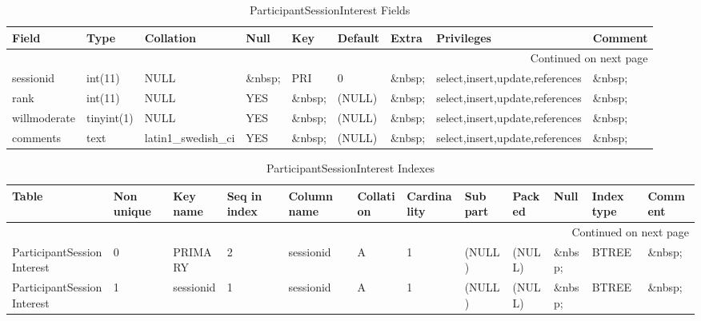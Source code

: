 \documentclass[tablesignature]{scrartcl}
\begin{document}
\begin{longtable}{|l|l|l|l|l|l|l|l|l|}
\caption{ParticipantSessionInterest Fields} \label{tbl:participantsessioninterestfields}\\
\hline
 Field         &  Type         &  Collation                &  Null     &  Key      &  Default  &  Extra    &  Privileges                       &  Comment \\
\hline
\endhead
\hline\multicolumn{9}{r}{Continued on next page}\
\endfoot
\endlastfoot
\hline
 badgeid       &  varchar(15)  &  latin1\_{}swedish\_{}ci  &  \&nbsp;  &  PRI      &  \&nbsp;  &  \&nbsp;  &  select,insert,update,references  &  \&nbsp;  \\
 sessionid     &  int(11)      &  NULL                     &  \&nbsp;  &  PRI      &  0        &  \&nbsp;  &  select,insert,update,references  &  \&nbsp;  \\
 rank          &  int(11)      &  NULL                     &  YES      &  \&nbsp;  &  (NULL)   &  \&nbsp;  &  select,insert,update,references  &  \&nbsp;  \\
 willmoderate  &  tinyint(1)   &  NULL                     &  YES      &  \&nbsp;  &  (NULL)   &  \&nbsp;  &  select,insert,update,references  &  \&nbsp;  \\
 comments      &  text         &  latin1\_{}swedish\_{}ci  &  YES      &  \&nbsp;  &  (NULL)   &  \&nbsp;  &  select,insert,update,references  &  \&nbsp;  \\
\hline
\end{longtable}


\begin{longtable}{|l|l|l|l|l|l|l|l|l|l|l|l|}
\caption{ParticipantSessionInterest Indexes} \label{tbl:participantsessioninterestindexes}\\
\hline
 Table                       &  Non unique  &  Key name   &  Seq in index  &  Column name  &  Collation  &  Cardinality  &  Sub part  &  Packed  &  Null     &  Index type  &  Comment \\
\hline
\endhead
\hline\multicolumn{12}{r}{Continued on next page}\
\endfoot
\endlastfoot
\hline
 ParticipantSessionInterest  &           0  &  PRIMARY    &             1  &  badgeid      &  A          &            1  &  (NULL)    &  (NULL)  &  \&nbsp;  &  BTREE       &  \&nbsp;  \\
 ParticipantSessionInterest  &           0  &  PRIMARY    &             2  &  sessionid    &  A          &            1  &  (NULL)    &  (NULL)  &  \&nbsp;  &  BTREE       &  \&nbsp;  \\
 ParticipantSessionInterest  &           1  &  sessionid  &             1  &  sessionid    &  A          &            1  &  (NULL)    &  (NULL)  &  \&nbsp;  &  BTREE       &  \&nbsp;  \\
\hline
\end{longtable}
\end{document}

